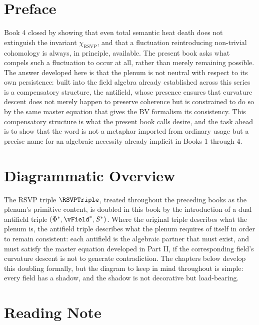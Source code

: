 \chapter*{Preface}

Book 4 closed by showing that even total semantic heat death does not extinguish the invariant $\chi_{\mathrm{RSVP}}$, and that a fluctuation reintroducing non-trivial cohomology is always, in principle, available. The present book asks what compels such a fluctuation to occur at all, rather than merely remaining possible. The answer developed here is that the plenum is not neutral with respect to its own persistence: built into the field algebra already established across this series is a compensatory structure, the antifield, whose presence ensures that curvature descent does not merely happen to preserve coherence but is constrained to do so by the same master equation that gives the BV formalism its consistency. This compensatory structure is what the present book calls desire, and the task ahead is to show that the word is not a metaphor imported from ordinary usage but a precise name for an algebraic necessity already implicit in Books 1 through 4.

\chapter*{Diagrammatic Overview}

The RSVP triple $\RSVPTriple$, treated throughout the preceding books as the plenum's primitive content, is doubled in this book by the introduction of a dual antifield triple $(\PhiField^{*}, \vField^{*}, \SEntropy^{*})$. Where the original triple describes what the plenum is, the antifield triple describes what the plenum requires of itself in order to remain consistent: each antifield is the algebraic partner that must exist, and must satisfy the master equation developed in Part II, if the corresponding field's curvature descent is not to generate contradiction. The chapters below develop this doubling formally, but the diagram to keep in mind throughout is simple: every field has a shadow, and the shadow is not decorative but load-bearing.

\chapter*{Reading Note}

